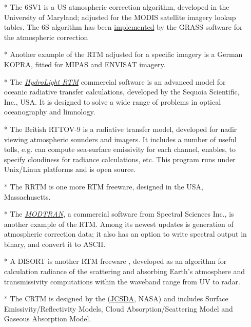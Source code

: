 \documentclass[11pt]{article}
\begin{document}
	\begin{itemize}
		\item [*] The \ac{6SV1}  is a US atmospheric correction algorithm, developed in the University of Maryland; adjusted for the \ac{MODIS} satellite imagery lookup tables. The 6S algorithm has been \href{http://grass.osgeo.org/grass64/manuals/html64_user/i.atcorr.html}{implemented} by the \ac{GRASS} software for the atmospheric correction 				 
		\item [*] Another example of the RTM adjusted for a specific imagery is a German \ac{KOPRA}, fitted for \ac{MIPAS} and \ac{ENVISAT} imagery.
		\item [*]  The \href{http://www.sequoiasci.com/products/Hydrolight.aspx}{\textit{HydroLight RTM}} commercial software is an advanced model for oceanic radiative transfer calculations, developed by the Sequoia Scientific, Inc., USA. It is designed to solve a wide range of problems in optical oceanography and limnology.   
		\item [*] The British \ac{RTTOV-9} is a radiative transfer model, developed for nadir viewing atmospheric sounders and imagers. It includes a number of useful tolls, e.g. can compute sea-surface emissivity for each channel, enables, to specify cloudiness for radiance calculations, etc.  This program runs under Unix/Linux platforms and is open source. 
		\item [*] The \ac{RRTM} is one more RTM freeware, designed in the USA, Massachusetts. 
		\item [*] The \href{http://www.modtran.org/}{\textit{MODTRAN}}, a commercial software from Spectral Sciences Inc., is another example of the RTM. Among its newest updates is generation of atmospheric correction data; it also has an option to write spectral output in binary, and convert it to \ac{ASCII}.
		\item [*] A \ac{DISORT}  is another RTM freeware , developed as an algorithm for calculation radiance of the scattering and absorbing Earth's atmosphere and transmissivity computations within the waveband range from UV to radar.  
		\item [*] The \ac{CRTM}  is designed by the  (\href{http://www.jcsda.noaa.gov/}{JCSDA}, \ac{NASA}) and includes Surface Emissivity/Reflectivity Models, Cloud Absorption/Scattering Model and Gaseous Absorption Model.

\end{itemize}
\end{document}
